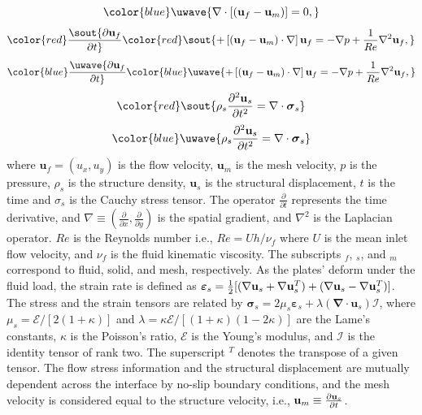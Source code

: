 \documentclass[%
aip,
amsmath,amssymb,
reprint,
]{revtex4-1}
\providecommand{\DIFadd}[1]{{\protect\color{blue}\uwave{#1}}} %
\providecommand{\DIFdel}[1]{{\protect\color{red}\sout{#1}}}                      %
\providecommand{\DIFaddbegin}{} %
\providecommand{\DIFaddend}{} %
\providecommand{\DIFdelbegin}{} %
\providecommand{\DIFdelend}{} %
\newcommand{\DIFscaledelfig}{0.5}
\newlength{\DIFdelgraphicswidth} %
\newlength{\DIFdelgraphicsheight} %
\newcommand{\DIFaddincludegraphics}[2][]{{\color{blue}\fbox{\DIFOincludegraphics[#1]{#2}}}} %
\newcommand{\DIFdelincludegraphics}[2][]{%
\sbox{\DIFdelgraphicsbox}{\DIFOincludegraphics[#1]{#2}}%
\settoboxwidth{\DIFdelgraphicswidth}{\DIFdelgraphicsbox} %
\settoboxtotalheight{\DIFdelgraphicsheight}{\DIFdelgraphicsbox} %
\scalebox{\DIFscaledelfig}{%
\parbox[b]{\DIFdelgraphicswidth}{\usebox{\DIFdelgraphicsbox}\\[-\baselineskip] \rule{\DIFdelgraphicswidth}{0em}}\llap{\resizebox{\DIFdelgraphicswidth}{\DIFdelgraphicsheight}{%
\setlength{\unitlength}{\DIFdelgraphicswidth}%
\begin{picture}(1,1)%
\thicklines\linethickness{2pt} %
{\color[rgb]{1,0,0}\put(0,0){\framebox(1,1){}}}%
{\color[rgb]{1,0,0}\put(0,0){\line( 1,1){1}}}%
{\color[rgb]{1,0,0}\put(0,1){\line(1,-1){1}}}%
\end{picture}%
}\hspace*{3pt}}} %
} %
\DeclareRobustCommand{\DIFaddbegin}{\DIFOaddbegin \let\includegraphics\DIFaddincludegraphics} %
\DeclareRobustCommand{\DIFaddend}{\DIFOaddend \let\includegraphics\DIFOincludegraphics} %
\DeclareRobustCommand{\DIFdelbegin}{\DIFOdelbegin \let\includegraphics\DIFdelincludegraphics} %
\DeclareRobustCommand{\DIFdelend}{\DIFOaddend \let\includegraphics\DIFOincludegraphics} %
\begin{document}
	
	\begin{equation}
		\DIFadd{\nabla\cdot\left[(\mathbf{u}_f-\mathbf{u}_m)\right] = 0,
	}\end{equation}\DIFaddend \vspace{-1.25cm}
	\DIFdelbegin \begin{displaymath}
	{\DIFdel{\partial\mathbf{u}_f\over\partial t}} \DIFdel{+ \left[(\mathbf{u}_f-\mathbf{u}_m) \cdot\mathbf{\nabla}\right]\mathbf{u}_f = -\nabla p+\frac{1}{Re}\nabla^2\mathbf{u}_f,
}\end{displaymath}%
\DIFdelend \DIFaddbegin \begin{equation}
		{\DIFadd{\partial\mathbf{u}_f\over\partial t}} \DIFadd{+ \left[(\mathbf{u}_f-\mathbf{u}_m) \cdot\mathbf{\nabla}\right]\mathbf{u}_f = -\nabla p+\frac{1}{Re}\nabla^2\mathbf{u}_f,
	}\end{equation}\DIFaddend \vspace{-1.25cm}
	\DIFdelbegin \begin{displaymath}
	\DIFdel{\rho_s{\partial^2\mathbf{u}_s\over\partial t^2} = \mathbf{\nabla}\cdot\mathbf{\boldsymbol{\sigma}}_s
}\end{displaymath}%
\DIFdelend \DIFaddbegin \begin{equation}
		\DIFadd{\rho_s{\partial^2\mathbf{u}_s\over\partial t^2} = \mathbf{\nabla}\cdot\mathbf{\boldsymbol{\sigma}}_s
	}\end{equation}\DIFaddend 
	where $\mathbf{u}_f=(u_x,u_y)$ is the flow velocity, $\mathbf{u}_m$ is the mesh velocity, $p$ is the pressure, $\rho_s$ is the structure density, $\mathbf{u}_s$ is the structural displacement, $t$ is the time and $\sigma_s$ is the Cauchy stress tensor. The operator $\frac{\partial}{\partial t}$ represents the time derivative, and $\nabla\equiv\left(\frac{\partial}{\partial x},\frac{\partial}{\partial y}\right)$ is the spatial gradient, and $\nabla^2$ is the Laplacian operator. $Re$ is the Reynolds number i.e., $Re=Uh/\nu_f$ where $U$ is the mean inlet flow velocity, and $\nu_f$ is the fluid kinematic viscosity. The subscripts $_f$, $_s$, and $_m$ correspond to fluid, solid, and mesh, respectively. As the plates' deform under the fluid load, the strain rate is defined as $\boldsymbol{\varepsilon}_s={1\over2}[(\mathbf{\nabla}\mathbf{u}_s+\mathbf{\nabla}\mathbf{u}_s^T)+(\mathbf{\nabla}\mathbf{u}_s - \mathbf{\nabla}\mathbf{u}_s^T)]$. The stress and the strain tensors are related by $\boldsymbol{\sigma}_s=2\mu_s \boldsymbol{\varepsilon}_s+\lambda( \mathbf{\nabla}\cdot\mathbf{u}_s)\mathcal{I}$, where $\mu_s=\mathcal{E}/[2(1+\kappa)]$ and $\lambda=\kappa \mathcal{E}/[(1+\kappa)(1-2\kappa)]$ are the Lame's constants, $\kappa$ is the Poisson's ratio, $\mathcal{E}$ is the Young's modulus, and $\mathcal{I}$ is the identity tensor of rank two. The superscript $^T$ denotes the transpose of a given tensor. The flow stress information and the structural displacement are mutually dependent across the interface by no-slip boundary conditions, and the mesh velocity is considered equal to the structure velocity, i.e., $\mathbf{u}_m\equiv {\partial\mathbf{u}_s\over\partial t}$.
\end{document}
